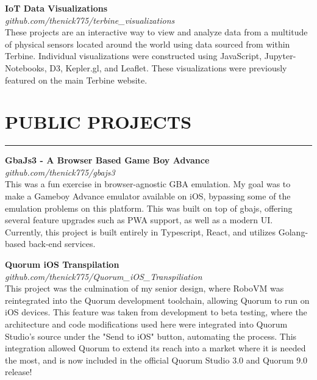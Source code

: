 \documentclass{res}
\begin{document}
\begin{resume}
		{\bf IoT Data Visualizations} \\
    \emph{github.com/thenick775/terbine\_visualizations} \hfill \vspace{4pt}\\
			These projects are an interactive way to view and analyze data from a multitude of physical sensors located around the world using data sourced from within Terbine. Individual visualizations were constructed using JavaScript, Jupyter-Notebooks, D3, Kepler.gl, and Leaflet. These visualizations were previously featured on the main Terbine website.

\vspace{-3pt}

		\section{{PUBLIC PROJECTS}}
    \noindent\rule[0.5ex]{\linewidth}{1pt}
        {\bf GbaJs3 - A Browser Based Game Boy Advance} \\
			\emph{github.com/thenick775/gbajs3} \hfill \vspace{3pt} \\
			This was a fun exercise in browser-agnostic GBA emulation. My goal was to make a Gameboy Advance emulator available on iOS, bypassing some of the emulation problems on this platform. This was built on top of gbajs, offering several feature upgrades such as PWA support, as well as a modern UI. Currently, this project is built entirely in Typescript, React, and utilizes Golang-based back-end services.

\vspace{-4pt}

		{\bf Quorum iOS Transpilation} \\
			\emph{github.com/thenick775/Quorum\_iOS\_Transpiliation} \hfill \vspace{2.5pt}\\
			This project was the culmination of my senior design, where RoboVM was reintegrated into the Quorum development toolchain, allowing Quorum to run on iOS devices. This feature was taken from development to beta testing, where the architecture and code modifications used here were integrated into Quorum Studio's source under the "Send to iOS" button, automating the process. This integration allowed Quorum to extend its reach into a market where it is needed the most, and is now included in the official Quorum Studio 3.0 and Quorum 9.0 release!

\vspace{-4pt}


\end{resume}
\end{document}

